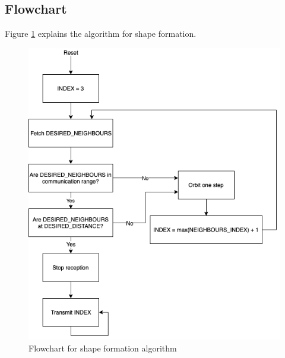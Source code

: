 \documentclass{report}[12pt]
\begin{document}
\subsection{Flowchart}
Figure \ref{fig:fc_shape_form} explains the algorithm for shape formation. 
\begin{figure}[H]
    \centering
    \includegraphics[scale=0.7]{"images/shape formation"}
    \caption{Flowchart for shape formation algorithm}
    \label{fig:fc_shape_form}
\end{figure}
\end{document}
